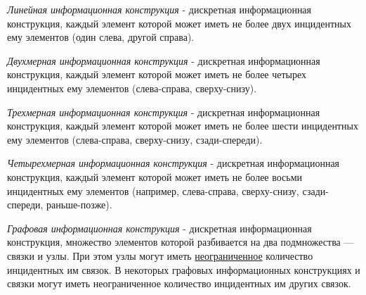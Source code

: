 \begin{SCn}

    \begin{scnindent}
    \end{scnindent}

\end{SCn}

\textit{Линейная информационная конструкция} - дискретная информационная конструкция, каждый элемент которой может иметь не более двух инцидентных ему элементов (один слева, другой справа).

\textit{Двухмерная информационная конструкция} - дискретная информационная конструкция, каждый элемент которой может иметь не более четырех инцидентных ему элементов (слева-справа, сверху-снизу).

\textit{Трехмерная информационная конструкция} - дискретная информационная конструкция, каждый элемент которой может иметь не более шести инцидентных ему элементов (слева-справа, сверху-снизу, сзади-спереди).

\textit{Четырехмерная информационная конструкция} - дискретная информационная конструкция, каждый элемент которой может иметь не более восьми инцидентных ему элементов (например, слева-справа, сверху-снизу, сзади-спереди, раньше-позже).

\textit{Графовая информационная конструкция} - дискретная информационная конструкция, множество элементов которой разбивается на два подмножества — связки и узлы.
При этом узлы могут иметь \underline{неограниченное} количество инцидентных им связок.
В некоторых графовых информационных конструкциях и связки могут иметь неограниченное количество инцидентных им других связок.

\begin{SCn}

    \begin{scnindent}
        \begin{scnindent}
        \end{scnindent}
    \end{scnindent}

\end{SCn}


